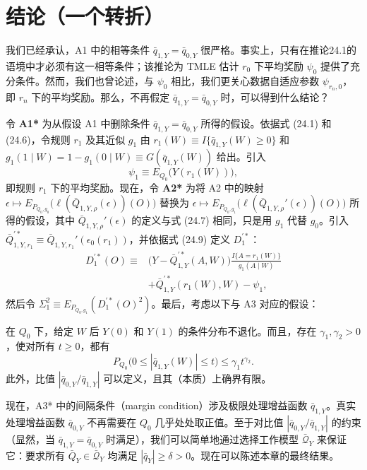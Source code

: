 \section{结论（一个转折）}

我们已经承认，A1 中的相等条件 $\bar q_{1,Y}=\bar q_{0,Y}$ 很严格。事实上，只有在推论24.1的语境中才必须有这一相等条件；该推论为 TMLE 估计 $r_0$ 下平均奖励 $\psi_0$ 提供了充分条件。然而，我们也曾论述，与 $\psi_0$ 相比，我们更关心数据自适应参数 $\psi_{r_n,0}$，即 $r_n$ 下的平均奖励。那么，不再假定 $\bar q_{1,Y}=\bar q_{0,Y}$ 时，可以得到什么结论？

令 \textbf{A1*} 为从假设 A1 中删除条件 $\bar q_{1,Y}=\bar q_{0,Y}$ 所得的假设。依据式 (24.1) 和 (24.6)，令规则 $r_1$ 及其近似 $g_1$ 由 $r_1(W)\equiv I\{\bar q_{1,Y}(W)\geq0\}$ 和 $g_1(1\mid W)=1-g_1(0\mid W)\equiv G(\bar q_{1,Y}(W))$ 给出。引入
\[
 \psi_1\equiv E_{Q_0}\bigl(Y(r_1(W))\bigr),
\]
即规则 $r_1$ 下的平均奖励。现在，令 \textbf{A2*} 为将 A2 中的映射 $\epsilon\mapsto E_{P_{Q_0,g_0}}\bigl(\ell(\bar Q_{1,Y,\rho}(\epsilon))(O)\bigr)$ 替换为 $\epsilon\mapsto E_{P_{Q_0,g_1}}\bigl(\ell(\bar Q_{1,Y,\rho}'(\epsilon))(O)\bigr)$ 所得的假设，其中 $\bar Q_{1,Y,\rho}'(\epsilon)$ 的定义与式 (24.7) 相同，只是用 $g_1$ 代替 $g_0$。引入 $\bar Q_{1,Y,r_1}^{\prime *}\equiv\bar Q_{1,Y,r_1}'(\epsilon_0(r_1))$，并依据式 (24.9) 定义 $D_1^{\prime *}$：
\[
 \begin{aligned}
 D_1^{\prime *}(O)\equiv{}&\bigl(Y-\bar Q_{1,Y}^{\prime *}(A,W)\bigr)\frac{I\{A=r_1(W)\}}{g_1(A\mid W)}\\
 &+\bar Q_{1,Y}^{\prime *}(r_1(W),W)-\psi_1,
 \end{aligned}
\]
然后令 $\Sigma_1^2\equiv E_{P_{Q_0,g_1}}(D_1^{\prime *}(O)^2)$。最后，考虑以下与 A3 对应的假设：
\begin{description}[leftmargin=3em,labelwidth=2.5em]
\item[A3*.] 在 $Q_0$ 下，给定 $W$ 后 $Y(0)$ 和 $Y(1)$ 的条件分布不退化。而且，存在 $\gamma_1,\gamma_2>0$，使对所有 $t\geq0$，都有
\begin{equation}
 P_{Q_0}\bigl(0\leq|\bar q_{1,Y}(W)|\leq t\bigr)\leq\gamma_1t^{\gamma_2}.
 \tag{24.12}
\end{equation}
此外，比值 $|\bar q_{0,Y}/\bar q_{1,Y}|$ 可以定义，且其（本质）上确界有限。
\end{description}
现在，A3* 中的间隔条件（margin condition）涉及极限处理增益函数 $\bar q_{1,Y}$。真实处理增益函数 $\bar q_{0,Y}$ 不再需要在 $Q_0$ 几乎处处取正值。至于对比值 $|\bar q_{0,Y}/\bar q_{1,Y}|$ 的约束（显然，当 $\bar q_{1,Y}=\bar q_{0,Y}$ 时满足），我们可以简单地通过选择工作模型 $\bar{\mathcal Q}_Y$ 来保证它：要求所有 $\bar Q_Y\in\bar{\mathcal Q}_Y$ 均满足 $|\bar q_Y|\geq\delta>0$。现在可以陈述本章的最终结果。

